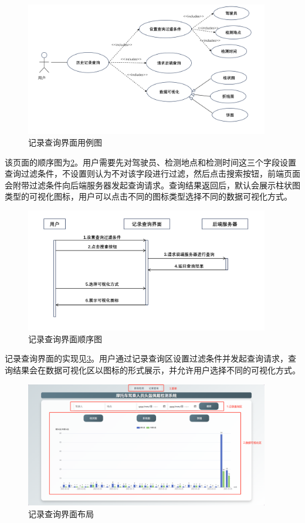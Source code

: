\begin{figure}[!htb]
    \centering
    \includegraphics[width=0.95\textwidth]{figs/chap05/uml2.png}
    \caption{记录查询界面用例图}
    \label{fig:uml2}
\end{figure}

该页面的顺序图为\ref{fig:seq2}。用户需要先对驾驶员、检测地点和检测时间这三个字段设置查询过滤条件，不设置则认为不对该字段进行过滤，然后点击搜索按钮，前端页面会附带过滤条件向后端服务器发起查询请求。查询结果返回后，默认会展示柱状图类型的可视化图标，用户可以点击不同的图标类型选择不同的数据可视化方式。

\begin{figure}[!htb]
    \centering
    \includegraphics[width=0.95\textwidth]{figs/chap05/seq2.png}
    \caption{记录查询界面顺序图}
    \label{fig:seq2}
\end{figure}


记录查询界面的实现见\ref{fig:search}。用户通过记录查询区设置过滤条件并发起查询请求，查询结果会在数据可视化区以图标的形式展示，并允许用户选择不同的可视化方式。

\begin{figure}[!htb]
    \centering
    \includegraphics[width=0.95\textwidth]{figs/chap05/search.png}
    \caption{记录查询界面布局}
    \label{fig:search}
\end{figure}

